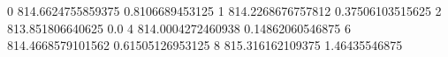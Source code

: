 0 814.6624755859375 0.8106689453125
1 814.2268676757812 0.37506103515625
2 813.851806640625 0.0
4 814.0004272460938 0.14862060546875
6 814.4668579101562 0.61505126953125
8 815.316162109375 1.46435546875
